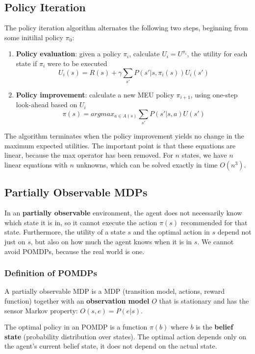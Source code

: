 \documentclass{scrartcl}
\begin{document}
\subsection{Policy Iteration}
The policy iteration algorithm alternates the following two steps, beginning from some initilial policy \(\pi_0\):
\begin{enumerate}
    \item
        \textbf{Policy evaluation}: given a policy \(\pi_i\), calculate \(U_i = U^{\pi_i}\), the utility for each state if \(\pi_i\) were to be executed
        \[U_i(s) = R(s) + \gamma \sum_{s'} P(s'|s, \pi_i(s))U_i(s')\]
    \item
        \textbf{Policy improvement}: calculate a new MEU policy \(\pi_{i+1}\), using one-step look-ahead based on \(U_i\)
        \[\pi(s) = argmax_{a \in A(s)} \sum_{s'} P(s'|s,a) U(s')\]
\end{enumerate}
The algorithm terminates when the policy improvement yields no change in the maximum expected utilities. The important point is that these equations are linear, because the max operator has been removed. For \(n\) states, we have \(n\) linear equations with \(n\) unknowns, which can be solved exactly in time \(O(n^3)\).

\subsection{Partially Observable MDPs}
In an \textbf{partially observable} environment, the agent does not necessarily know which state it is in, so it cannot execute the action \(\pi(s)\) recommended for that state. Furthermore, the utility of a state \(s\) and the optimal action in \(s\) depend not just on \(s\), but also on how much the agent knows when it is in \(s\). We cannot avoid POMDPs, because the real world is one.

\subsubsection{Definition of POMDPs}
A partially observable MDP is a MDP (transition model, actions, reward function) together with an \textbf{observation model} \(O\) that is stationary and has the sensor Markov property: \(O(s,e) = P(e|s)\).

The optimal policy in an POMDP is a function \(\pi(b)\) where \(b\) is the \textbf{belief state} (probability distribution over states). The optimal action depends only on the agent's current belief state, it does not depend on the actual state.
\end{document}
